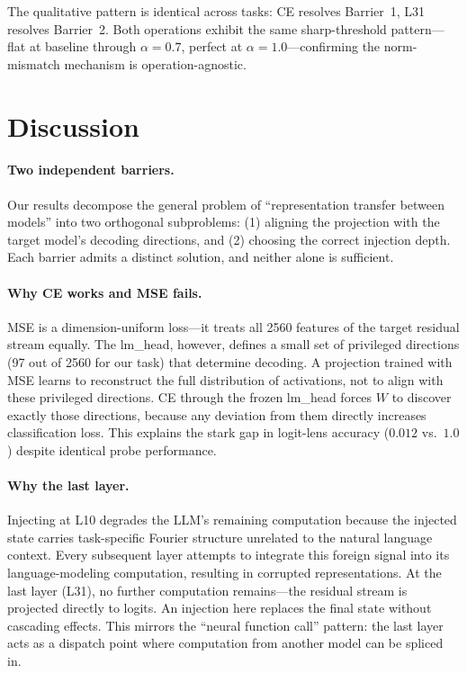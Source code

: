 \documentclass{article}
\begin{document}
The qualitative pattern is identical across tasks: CE resolves Barrier~1,
L31 resolves Barrier~2.  Both operations exhibit the same
sharp-threshold pattern---flat at baseline through $\alpha=0.7$,
perfect at $\alpha=1.0$---confirming the norm-mismatch mechanism is
operation-agnostic.

\section{Discussion}
\label{sec:discussion}

\paragraph{Two independent barriers.}
Our results decompose the general problem of ``representation transfer
between models'' into two orthogonal subproblems: (1) aligning the
projection with the target model's decoding directions, and (2) choosing
the correct injection depth.  Each barrier admits a distinct solution,
and neither alone is sufficient.

\paragraph{Why CE works and MSE fails.}
MSE is a dimension-uniform loss---it treats all 2560 features of the target
residual stream equally.  The lm\_head, however, defines a small set of
privileged directions (97 out of 2560 for our task) that determine decoding.
A projection trained with MSE learns to reconstruct the full distribution of
activations, not to align with these privileged directions.  CE through the
frozen lm\_head forces $W$ to discover exactly those directions, because
any deviation from them directly increases classification loss.
This explains the stark gap in logit-lens accuracy ($0.012$ vs.\ $1.0$)
despite identical probe performance.

\paragraph{Why the last layer.}
Injecting at L10 degrades the LLM's remaining computation because the
injected state carries task-specific Fourier structure unrelated to the
natural language context.  Every subsequent layer attempts to integrate
this foreign signal into its language-modeling computation, resulting in
corrupted representations.  At the last layer (L31), no further computation
remains---the residual stream is projected directly to logits.  An
injection here replaces the final state without cascading effects.
This mirrors the ``neural function call'' pattern: the last layer acts as
a dispatch point where computation from another model can be spliced in.
\end{document}
